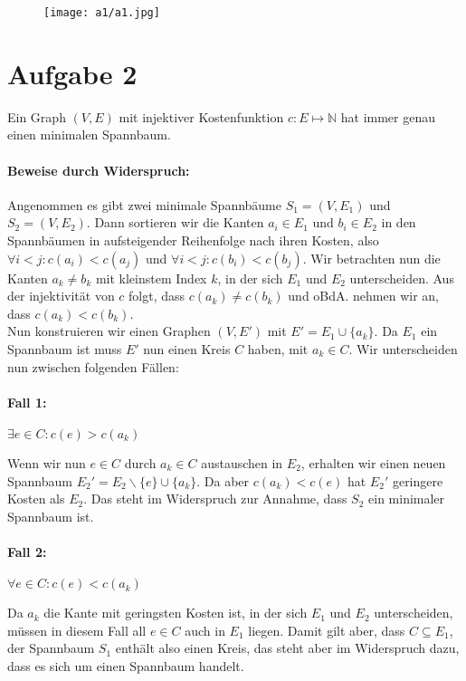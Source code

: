 \documentclass[a4paper,11pt]{article}
\begin{document}
\begin{figure}[h]
\texttt{[image: a1/a1.jpg]}
\end{figure}

\section*{Aufgabe 2}
Ein Graph $(V,E)$ mit injektiver Kostenfunktion $c: E \mapsto \mathbb{N}$ hat immer genau einen minimalen Spannbaum.

\paragraph{Beweise durch Widerspruch:}$\;$\\

Angenommen es gibt zwei minimale Spannbäume $S_1 = (V,E_1)$ und $S_2 = (V,E_2)$. Dann sortieren wir die Kanten $a_i \in E_1$ und $b_i \in E_2$ in den Spannbäumen in aufsteigender Reihenfolge nach ihren Kosten, also $\forall i<j : c(a_i)< c(a_j)$ und $\forall i<j : c(b_i)< c(b_j)$. Wir betrachten nun die Kanten $a_k \neq b_k$ mit kleinstem Index $k$, in der sich $E_1$ und $E_2$ unterscheiden. Aus der injektivität von $c$ folgt, dass $c(a_k) \neq c(b_k)$ und oBdA. nehmen wir an, dass $c(a_k) < c(b_k)$. \\

Nun konstruieren wir einen Graphen $(V,E')$ mit $E' = E_1 \cup \{a_k\}$. Da $E_1$ ein Spannbaum ist muss $E'$ nun einen Kreis $C$ haben, mit $a_k \in C$. Wir unterscheiden nun zwischen folgenden Fällen:

\paragraph{Fall 1:} $\exists e \in C: c(e) > c(a_k)$

Wenn wir nun $e \in C$ durch $a_k \in C$ austauschen in $E_2$, erhalten wir einen neuen Spannbaum $E_2' = E_2 \backslash \{e\} \cup \{a_k\}$. Da aber $c(a_k) < c(e)$ hat $E_2'$ geringere Kosten als $E_2$. Das steht im Widerspruch zur Annahme, dass $S_2$ ein minimaler Spannbaum ist.

\paragraph{Fall 2:} $\forall e \in C: c(e) < c(a_k)$

Da $a_k$ die Kante mit geringsten Kosten ist, in der sich $E_1$ und $E_2$ unterscheiden, müssen in diesem Fall all $e \in C$ auch in $E_1$ liegen. Damit gilt aber, dass $C \subseteq E_1$, der Spannbaum $S_1$ enthält also einen Kreis, das steht aber im Widerspruch dazu, dass es sich um einen Spannbaum handelt. \\
\end{document}
